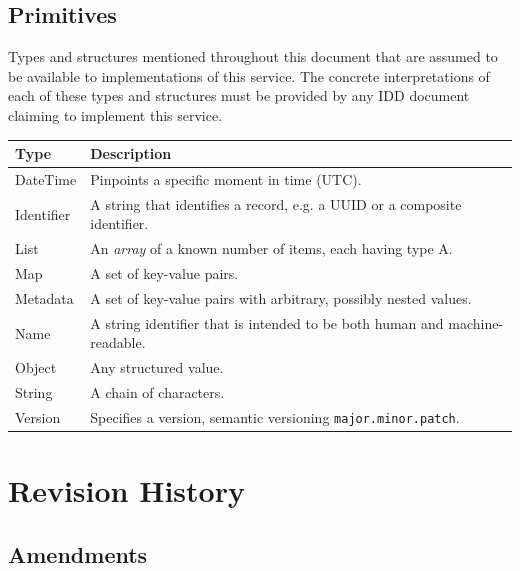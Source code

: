 \documentclass[a4paper]{arrowhead}
\newcommand{\pdef}[1]{{\textcolor{ArrowheadGrey}{#1\label{sec:model:primitives:#1}\label{sec:model:primitives:#1s}\label{sec:model:primitives:#1es}}}}
\begin{document}
\subsection{Primitives}
\label{sec:model:primitives}

Types and structures mentioned throughout this document that are assumed to be available to implementations of this service.
The concrete interpretations of each of these types and structures must be provided by any IDD document claiming to implement this service.

\noindent\begin{tabularx}{\textwidth}{| p{4.6cm} | X |} \hline
\rowcolor{gray!33} Type & Description \\ \hline
\pdef{DateTime} & Pinpoints a specific moment in time (UTC). \\ \hline
\pdef{Identifier} & A string that identifies a record, e.g. a UUID or a composite identifier. \\ \hline
\pdef{List} & An \textit{array} of a known number of items, each having type A. \\ \hline
\pdef{Map} & A set of key-value pairs. \\ \hline
\pdef{Metadata} & A set of key-value pairs with arbitrary, possibly nested values. \\ \hline
\pdef{Name} & A string identifier that is intended to be both human and machine-readable. \\ \hline
\pdef{Object} & Any structured value. \\ \hline
\pdef{String} & A chain of characters. \\ \hline
\pdef{Version} & Specifies a version, semantic versioning \texttt{major.minor.patch}. \\ \hline
\end{tabularx}

\newpage




\newpage

\section{Revision History}
\subsection{Amendments}
\end{document}
